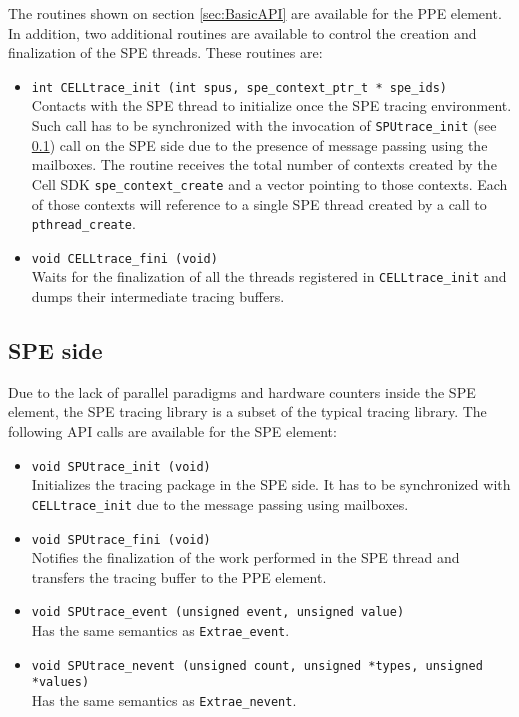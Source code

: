 The routines shown on section \ref{sec:BasicAPI} are available for the PPE element. In addition, two additional routines are available to control the creation and finalization of the SPE threads. These routines are:

\begin{itemize}

 \item {\tt int  CELLtrace\_init (int spus, spe\_context\_ptr\_t * spe\_ids)}\\
 Contacts with the SPE thread to initialize once the SPE tracing environment. Such call has to be synchronized with the invocation of {\tt SPUtrace\_init} (see \ref{subsec:SPEside}) call on the SPE side due to the presence of message passing using the mailboxes. The routine receives the total number of contexts created by the Cell SDK {\tt spe\_context\_create} and a vector pointing to those contexts. Each of those contexts will reference to a single SPE thread created by a call to {\tt pthread\_create}.

 \item {\tt void CELLtrace\_fini (void)}\\
 Waits for the finalization of all the threads registered in {\tt CELLtrace\_init} and dumps their intermediate tracing buffers.

\end{itemize}

\subsection{SPE side}\label{subsec:SPEside}

Due to the lack of parallel paradigms and hardware counters inside the SPE element, the SPE tracing library is a subset of the typical tracing library. The following API calls are available for the SPE element:

\begin{itemize}

 \item {\tt void SPUtrace\_init (void)}\\
 Initializes the tracing package in the SPE side. It has to be synchronized with {\tt CELLtrace\_init} due to the message passing using mailboxes.

 \item {\tt void SPUtrace\_fini (void)}\\
 Notifies the finalization of the work performed in the SPE thread and transfers the tracing buffer to the PPE element.

 \item {\tt void SPUtrace\_event (unsigned event, unsigned value)}\\
 Has the same semantics as {\tt Extrae\_event}.

 \item {\tt void SPUtrace\_nevent (unsigned count, unsigned *types, unsigned *values)}\\
 Has the same semantics as {\tt Extrae\_nevent}.

\end{itemize}

